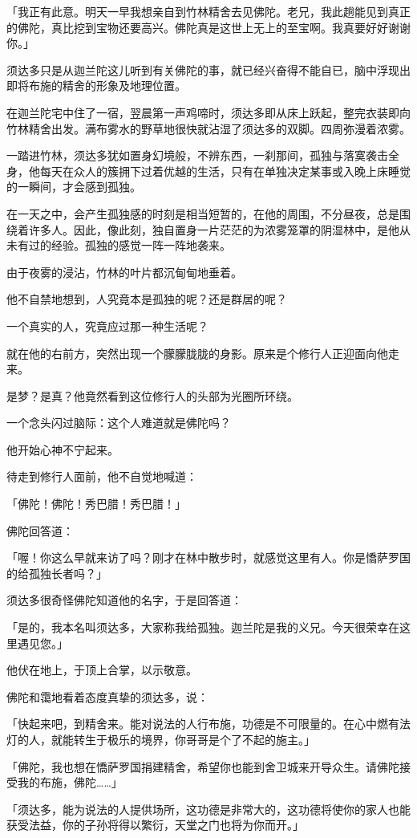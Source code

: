 \documentclass[twoside,openany]{book}
\begin{document}
「我正有此意。明天一早我想亲自到竹林精舍去见佛陀。老兄，我此趟能见到真正的佛陀，真比挖到宝物还要高兴。佛陀真是这世上无上的至宝啊。我真要好好谢谢你。」

须达多只是从迦兰陀这儿听到有关佛陀的事，就已经兴奋得不能自已，脑中浮现出即将布施的精舍的形象及地理位置。

在迦兰陀宅中住了一宿，翌晨第一声鸡啼时，须达多即从床上跃起，整完衣装即向竹林精舍出发。满布雾水的野草地很快就沾湿了须达多的双脚。四周弥漫着浓雾。

一踏进竹林，须达多犹如置身幻境般，不辨东西，一刹那间，孤独与落寞袭击全身，他每天在众人的簇拥下过着优越的生活，只有在单独决定某事或入晚上床睡觉的一瞬间，才会感到孤独。

在一天之中，会产生孤独感的时刻是相当短暂的，在他的周围，不分昼夜，总是围绕着许多人。因此，像此刻，独自置身一片茫茫的为浓雾笼罩的阴湿林中，是他从未有过的经验。孤独的感觉一阵一阵地袭来。

由于夜雾的浸沾，竹林的叶片都沉甸甸地垂着。

他不自禁地想到，人究竟本是孤独的呢？还是群居的呢？

一个真实的人，究竟应过那一种生活呢？

就在他的右前方，突然出现一个朦朦胧胧的身影。原来是个修行人正迎面向他走来。

是梦？是真？他竟然看到这位修行人的头部为光圈所环绕。

一个念头闪过脑际：这个人难道就是佛陀吗？

他开始心神不宁起来。

待走到修行人面前，他不自觉地喊道：

「佛陀！佛陀！秀巴腊！秀巴腊！」

佛陀回答道：

「喔！你这么早就来访了吗？刚才在林中散步时，就感觉这里有人。你是憍萨罗国的给孤独长者吗？」

须达多很奇怪佛陀知道他的名字，于是回答道：

「是的，我本名叫须达多，大家称我给孤独。迦兰陀是我的义兄。今天很荣幸在这里遇见您。」

他伏在地上，于顶上合掌，以示敬意。

佛陀和霭地看着态度真挚的须达多，说：

「快起来吧，到精舍来。能对说法的人行布施，功德是不可限量的。在心中燃有法灯的人，就能转生于极乐的境界，你哥哥是个了不起的施主。」

「佛陀，我也想在憍萨罗国捐建精舍，希望你也能到舍卫城来开导众生。请佛陀接受我的布施，佛陀……」

「须达多，能为说法的人提供场所，这功德是非常大的，这功德将使你的家人也能获受法益，你的子孙将得以繁衍，天堂之门也将为你而开。」
\end{document}
